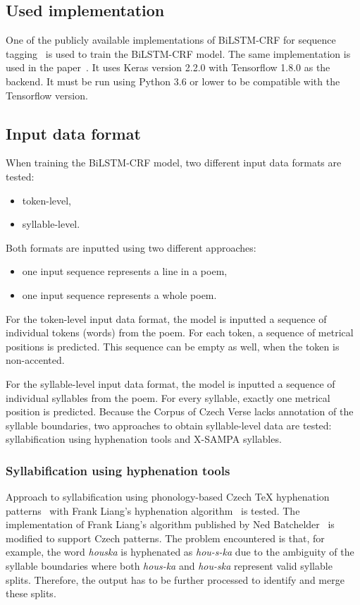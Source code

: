 \subsection{Used implementation}
One of the publicly available implementations of BiLSTM-CRF for sequence tagging~\cite{GitBiLSTMCRF} is used to train the BiLSTM-CRF model. The same implementation is used in the paper~\cite{MetricalTaggingInTheWild}. It uses Keras version 2.2.0 with Tensorflow 1.8.0 as the backend. It must be run using Python 3.6 or lower to be compatible with the Tensorflow version.~\cite{GitBiLSTMCRF}
 
\subsection{Input data format}
When training the BiLSTM-CRF model, two different input data formats are tested:
\begin{itemize}
    \item token-level,
    \item syllable-level.
\end{itemize}

Both formats are inputted using two different approaches:
\begin{itemize}
    \item one input sequence represents a line in a poem,
    \item one input sequence represents a whole poem.
\end{itemize}

For the token-level input data format, the model is inputted a sequence of individual tokens (words) from the poem. For each token, a sequence of metrical positions is predicted. This sequence can be empty as well, when the token is non-accented.

For the syllable-level input data format, the model is inputted a sequence of individual syllables from the poem. For every syllable, exactly one metrical position is predicted. Because the Corpus of Czech Verse lacks annotation of the syllable boundaries, two approaches to obtain syllable-level data are tested: syllabification using hyphenation tools and X-SAMPA syllables.

\subsubsection{Syllabification using hyphenation tools}
Approach to syllabification using phonology-based Czech \TeX{} hyphenation patterns~\cite{UnreasonableEffectiveness} with Frank Liang’s hyphenation algorithm~\cite{HyphenationLiang} is tested. The implementation of Frank Liang’s algorithm published by Ned Batchelder~\cite{HyphenateBatchelder} is modified to support Czech patterns. The problem encountered is that, for example, the word \emph{houska} is hyphenated as \emph{hou-s-ka} due to the ambiguity of the syllable boundaries where both \emph{hous-ka} and \emph{hou-ska} represent valid syllable splits. Therefore, the output has to be further processed to identify and merge these splits.

